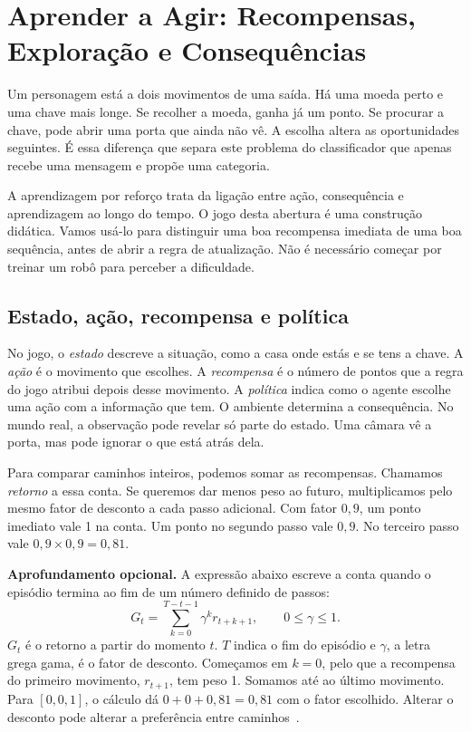 \chapter{Aprender a Agir: Recompensas, Exploração e Consequências}
\label{ch:rl}

Um personagem está a dois movimentos de uma saída. Há uma moeda perto e uma chave mais longe. Se recolher a moeda, ganha já um ponto. Se procurar a chave, pode abrir uma porta que ainda não vê. A escolha altera as oportunidades seguintes. É essa diferença que separa este problema do classificador que apenas recebe uma mensagem e propõe uma categoria.

A aprendizagem por reforço trata da ligação entre ação, consequência e aprendizagem ao longo do tempo. O jogo desta abertura é uma construção didática. Vamos usá-lo para distinguir uma boa recompensa imediata de uma boa sequência, antes de abrir a regra de atualização. Não é necessário começar por treinar um robô para perceber a dificuldade.

\section{Estado, ação, recompensa e política}
No jogo, o \emph{estado} descreve a situação, como a casa onde estás e se tens a chave. A \emph{ação} é o movimento que escolhes. A \emph{recompensa} é o número de pontos que a regra do jogo atribui depois desse movimento. A \emph{política} indica como o agente escolhe uma ação com a informação que tem. O ambiente determina a consequência. No mundo real, a observação pode revelar só parte do estado. Uma câmara vê a porta, mas pode ignorar o que está atrás dela.

Para comparar caminhos inteiros, podemos somar as recompensas. Chamamos \emph{retorno} a essa conta. Se queremos dar menos peso ao futuro, multiplicamos pelo mesmo fator de desconto a cada passo adicional. Com fator $0{,}9$, um ponto imediato vale 1 na conta. Um ponto no segundo passo vale $0{,}9$. No terceiro passo vale $0{,}9\times0{,}9=0{,}81$.

\textbf{Aprofundamento opcional.} A expressão abaixo escreve a conta quando o episódio termina ao fim de um número definido de passos:
\[
G_t=\sum_{k=0}^{T-t-1}\gamma^k r_{t+k+1},\qquad 0\leq\gamma\leq1.
\]
$G_t$ é o retorno a partir do momento $t$. $T$ indica o fim do episódio e $\gamma$, a letra grega gama, é o fator de desconto. Começamos em $k=0$, pelo que a recompensa do primeiro movimento, $r_{t+1}$, tem peso 1. Somamos até ao último movimento. Para $[0,0,1]$, o cálculo dá $0+0+0{,}81=0{,}81$ com o fator escolhido. Alterar o desconto pode alterar a preferência entre caminhos~\citep{sutton2018}.

